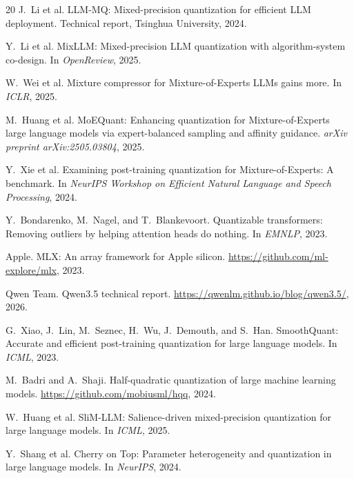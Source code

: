 \documentclass{article}
\begin{document}
\begin{thebibliography}{20}
J.~Li et al.
\newblock LLM-MQ: Mixed-precision quantization for efficient LLM deployment.
\newblock Technical report, Tsinghua University, 2024.

Y.~Li et al.
\newblock MixLLM: Mixed-precision LLM quantization with algorithm-system co-design.
\newblock In \emph{OpenReview}, 2025.

W.~Wei et al.
\newblock Mixture compressor for Mixture-of-Experts LLMs gains more.
\newblock In \emph{ICLR}, 2025.

M.~Huang et al.
\newblock MoEQuant: Enhancing quantization for Mixture-of-Experts large language models via expert-balanced sampling and affinity guidance.
\newblock \emph{arXiv preprint arXiv:2505.03804}, 2025.

Y.~Xie et al.
\newblock Examining post-training quantization for Mixture-of-Experts: A benchmark.
\newblock In \emph{NeurIPS Workshop on Efficient Natural Language and Speech Processing}, 2024.

Y.~Bondarenko, M.~Nagel, and T.~Blankevoort.
\newblock Quantizable transformers: Removing outliers by helping attention heads do nothing.
\newblock In \emph{EMNLP}, 2023.

Apple.
\newblock MLX: An array framework for Apple silicon.
\newblock \url{https://github.com/ml-explore/mlx}, 2023.

Qwen Team.
\newblock Qwen3.5 technical report.
\newblock \url{https://qwenlm.github.io/blog/qwen3.5/}, 2026.

G.~Xiao, J.~Lin, M.~Seznec, H.~Wu, J.~Demouth, and S.~Han.
\newblock SmoothQuant: Accurate and efficient post-training quantization for large language models.
\newblock In \emph{ICML}, 2023.

M.~Badri and A.~Shaji.
\newblock Half-quadratic quantization of large machine learning models.
\newblock \url{https://github.com/mobiusml/hqq}, 2024.

W.~Huang et al.
\newblock SliM-LLM: Salience-driven mixed-precision quantization for large language models.
\newblock In \emph{ICML}, 2025.

Y.~Shang et al.
\newblock Cherry on Top: Parameter heterogeneity and quantization in large language models.
\newblock In \emph{NeurIPS}, 2024.

\end{thebibliography}
\end{document}
